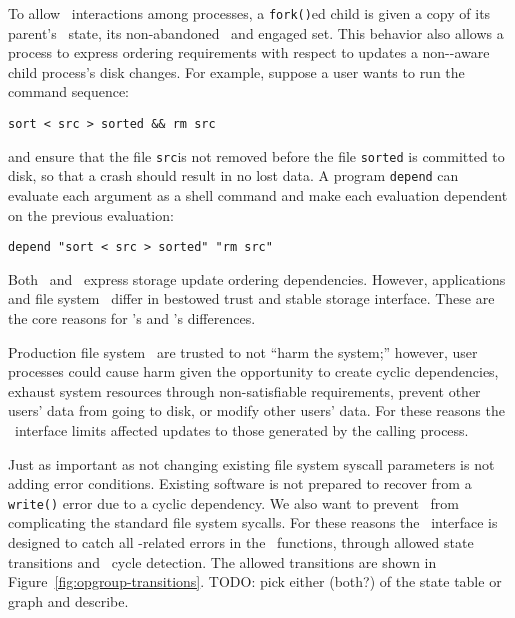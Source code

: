 To allow \opgroup\ interactions among processes, a \verb+fork()+ed
child is given a copy of its parent's \opgroup\ state, its
non-abandoned \opgroups\ and engaged set. This behavior also allows a
process to express ordering requirements with respect to updates a
non-\opgroup-aware child process's disk changes. For example, suppose
a user wants to run the command sequence:
%
\vspace{-0.5\baselineskip}
\begin{center}
\begin{small}
\verb+sort < src > sorted && rm src+
\end{small}
\end{center}
\vspace{-0.5\baselineskip}
%
and ensure that the file \verb+src+is not removed before the file
\verb+sorted+ is committed to disk, so that a crash should result in
no lost data. A program \texttt{depend} can evaluate each argument as
a shell command and make each evaluation dependent on the previous
evaluation:
%
\vspace{-0.5\baselineskip}
\begin{center}
\begin{small}
\verb+depend "sort < src > sorted" "rm src"+
\end{small}
\end{center}
\vspace{-0.5\baselineskip}


Both \opgroups\ and \chdescs\ express storage update ordering
dependencies. However, applications and file system \modules\ differ
in bestowed trust and stable storage interface. These are the core
reasons for \opgroup{}'s and \chdesc{}'s differences.

Production file system \modules\ are trusted to not ``harm the
system;'' however, user processes could cause harm given the
opportunity to create cyclic dependencies, exhaust system resources
through non-satisfiable requirements, prevent other users' data from
going to disk, or modify other users' data. For these reasons the
\opgroup\ interface limits affected updates to those generated by the
calling process.

Just as important as not changing existing file system syscall
parameters is not adding error conditions. Existing software is not
prepared to recover from a \texttt{write()} error due to a cyclic
dependency. We also want to prevent \opgroups\ from complicating the
standard file system sycalls. For these reasons the \opgroup\
interface is designed to catch all \opgroup{}-related errors in the
\opgroup\ functions, through allowed state transitions and
\opgroupAddDepend\ cycle detection. The allowed transitions are shown
in Figure~\ref{fig:opgroup-transitions}. TODO: pick either (both?) of
the state table or graph and describe.

